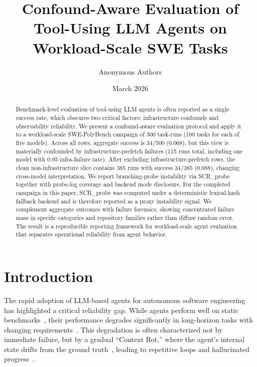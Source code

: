 \documentclass[11pt]{article}
\title{Confound-Aware Evaluation of Tool-Using LLM Agents on Workload-Scale SWE Tasks}
\author{Anonymous Authors}
\date{March 2026}
\begin{document}
\maketitle

\begin{abstract}
Benchmark-level evaluation of tool-using LLM agents is often reported as a single success rate, which obscures two critical factors: infrastructure confounds and observability reliability. We present a confound-aware evaluation protocol and apply it to a workload-scale SWE-PolyBench campaign of 500 task-runs (100 tasks for each of five models). Across all rows, aggregate success is 34/500 (0.068), but this view is materially confounded by infrastructure-prefetch failures (115 runs total, including one model with 0.95 infra-failure rate). After excluding infrastructure-prefetch rows, the clean non-infrastructure slice contains 385 runs with success 34/385 (0.088), changing cross-model interpretation. We report branching-probe instability via SCR\_probe together with probe-log coverage and backend mode disclosure. For the completed campaign in this paper, SCR\_probe was computed under a deterministic lexical-hash fallback backend and is therefore reported as a proxy instability signal. We complement aggregate outcomes with failure forensics, showing concentrated failure mass in specific categories and repository families rather than diffuse random error. The result is a reproducible reporting framework for workload-scale agent evaluation that separates operational reliability from agent behavior.
\end{abstract}

\section{Introduction}
The rapid adoption of LLM-based agents for autonomous software engineering~\cite{yao2023react,schick2023toolformer,xi2023rise} has highlighted a critical reliability gap. While agents perform well on static benchmarks~\cite{jimenez2024swebench,chen2021codex}, their performance degrades significantly in long-horizon tasks with changing requirements~\cite{Chen2024ToolsFail,Guo2024Defects}. This degradation is often characterized not by immediate failure, but by a gradual ``Context Rot,'' where the agent's internal state drifts from the ground truth~\cite{liu2023lost,Wang2025ComplexityTrap}, leading to repetitive loops and hallucinated progress~\cite{huang2024selfcorrect,ji2023hallucination}.
\end{document}
